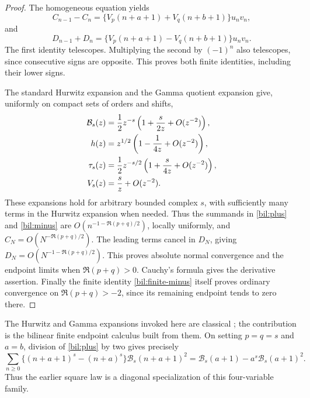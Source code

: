 \documentclass[11pt]{article}
\theoremstyle{definition}
\theoremstyle{remark}
\numberwithin{equation}{section}
\begin{document}
\begin{proof}
The homogeneous equation yields
\[
 C_{n-1}-C_n=\{V_p(n+a+1)+V_q(n+b+1)\}u_nv_n,
\]
and
\[
 D_{n-1}+D_n=\{V_p(n+a+1)-V_q(n+b+1)\}u_nv_n.
\]
The first identity telescopes. Multiplying the second by $(-1)^n$
also telescopes, since consecutive signs are opposite. This proves
both finite identities, including their lower signs.

The standard Hurwitz expansion and the Gamma quotient expansion give,
uniformly on compact sets of orders and shifts,
\begin{align}
 \mathcal B_s(z)&=\frac12z^{-s}
                       \left(1+\frac{s}{2z}+O(z^{-2})\right),\notag\\
 h(z)&=z^{1/2}\left(1-\frac1{4z}+O(z^{-2})\right),\notag\\
 \tau_s(z)&=\frac12z^{-s/2}
                       \left(1+\frac{s}{4z}+O(z^{-2})\right),
                         \label{bil:asymptotics}\\
 V_s(z)&=\frac{s}{z}+O(z^{-2}).\notag
\end{align}
These expansions hold for arbitrary bounded complex $s$, with
sufficiently many terms in the Hurwitz expansion when needed. Thus
the summands in \eqref{bil:plus} and \eqref{bil:minus} are
$O(n^{-1-\Re(p+q)/2})$, locally uniformly, and
$C_N=O(N^{-\Re(p+q)/2})$. The leading terms cancel in $D_N$, giving
$D_N=O(N^{-1-\Re(p+q)/2})$. This proves absolute normal convergence
and the endpoint limits when $\Re(p+q)>0$. Cauchy's formula gives
the derivative assertion. Finally the finite identity
\eqref{bil:finite-minus} itself proves ordinary convergence on
$\Re(p+q)>-2$, since its remaining endpoint tends to zero there.
\end{proof}

The Hurwitz and Gamma expansions invoked here are classical
\cite{bil:DLMF}; the contribution is the bilinear finite endpoint
calculus built from them. On setting $p=q=s$ and $a=b$, division
of \eqref{bil:plus} by two gives precisely
\[
 \sum_{n\ge0}\{(n+a+1)^s-(n+a)^s\}\mathcal B_s(n+a+1)^2
 =\mathcal B_s(a+1)-a^s\mathcal B_s(a+1)^2.
\]
Thus the earlier square law is a diagonal specialization of this
four-variable family.
\end{document}
